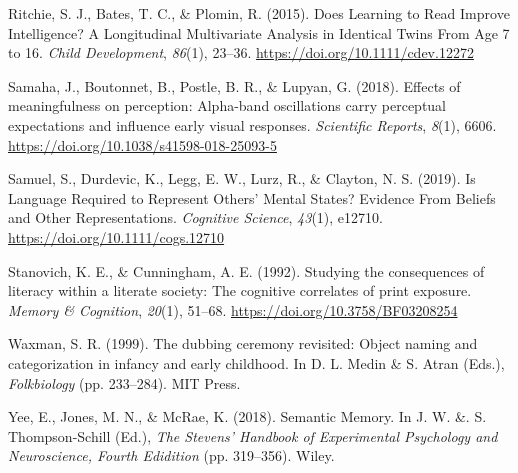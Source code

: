 \documentclass[11pt,man]{article}
\newlength{\cslhangindent}
\newenvironment{cslreferences}%
  {\setlength{\parindent}{0pt}%
  \everypar{\setlength{\hangindent}{\cslhangindent}}\ignorespaces}%
  {\par}
\begin{document}
\begin{cslreferences}
\leavevmode\hypertarget{ref-ritchie_does_2015}{}%
Ritchie, S. J., Bates, T. C., \& Plomin, R. (2015). Does Learning to
Read Improve Intelligence? A Longitudinal Multivariate Analysis in
Identical Twins From Age 7 to 16. \emph{Child Development},
\emph{86}(1), 23--36. \url{https://doi.org/10.1111/cdev.12272}

\leavevmode\hypertarget{ref-samaha_effects_2018}{}%
Samaha, J., Boutonnet, B., Postle, B. R., \& Lupyan, G. (2018). Effects
of meaningfulness on perception: Alpha-band oscillations carry
perceptual expectations and influence early visual responses.
\emph{Scientific Reports}, \emph{8}(1), 6606.
\url{https://doi.org/10.1038/s41598-018-25093-5}

\leavevmode\hypertarget{ref-samuel_is_2019}{}%
Samuel, S., Durdevic, K., Legg, E. W., Lurz, R., \& Clayton, N. S.
(2019). Is Language Required to Represent Others' Mental States?
Evidence From Beliefs and Other Representations. \emph{Cognitive
Science}, \emph{43}(1), e12710. \url{https://doi.org/10.1111/cogs.12710}

\leavevmode\hypertarget{ref-stanovich_studying_1992}{}%
Stanovich, K. E., \& Cunningham, A. E. (1992). Studying the consequences
of literacy within a literate society: The cognitive correlates of print
exposure. \emph{Memory \& Cognition}, \emph{20}(1), 51--68.
\url{https://doi.org/10.3758/BF03208254}

\leavevmode\hypertarget{ref-waxman_dubbing_1999}{}%
Waxman, S. R. (1999). The dubbing ceremony revisited: Object naming and
categorization in infancy and early childhood. In D. L. Medin \& S.
Atran (Eds.), \emph{Folkbiology} (pp. 233--284). MIT Press.

\leavevmode\hypertarget{ref-yee_semantic_2018}{}%
Yee, E., Jones, M. N., \& McRae, K. (2018). Semantic Memory. In J. W.
\&. S. Thompson-Schill (Ed.), \emph{The Stevens' Handbook of
Experimental Psychology and Neuroscience, Fourth Edidition} (pp.
319--356). Wiley.
\end{cslreferences}
\end{document}
